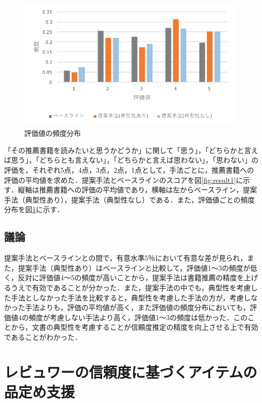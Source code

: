 \documentclass[a4paper,11pt,oneside,openany]{jsbook}
\begin{document}
\begin{figure}[tb]
	\begin{center} %
		\includegraphics [width = 110mm] {figures/result.pdf} %
	\end{center}
	\caption{評価値の頻度分布} %
	\label{fig:result2} %
\end{figure}

「その推薦書籍を読みたいと思うかどうか」に関して「思う」，「どちらかと言えば思う」，「どちらとも言えない」，「どちらかと言えば思わない」，「思わない」の評価を，それぞれ5点，4点，3点，2点，1点として，手法ごとに，推薦書籍への評価の平均値を求めた．提案手法とベースラインのスコアを図\ref{fig:result1}に示す．縦軸は推薦書籍への評価の平均値であり，横軸は左からベースライン，提案手法（典型性あり），提案手法（典型性なし）である．また，評価値ごとの頻度分布を図\ref{fig:result2}に示す．
	\section{議論}
提案手法とベースラインとの間で，有意水準5％において有意な差が見られ，また，提案手法（典型性あり）はベースラインと比較して，評価値1〜3の頻度が低く，反対に評価値4〜5の頻度が高いことから，提案手法は書籍推薦の精度を上げるうえで有効であることが分かった．また，提案手法の中でも，典型性を考慮した手法としなかった手法を比較すると，典型性を考慮した手法の方が，考慮しなかった手法よりも，評価の平均値が高く，また評価値の頻度分布においても，評価値4の頻度が考慮しない手法より高く，評価値1〜3の頻度は低かった．このことから，文書の典型性を考慮することが信頼度推定の精度を向上させる上で有効であることがわかった．


\chapter{レビュワーの信頼度に基づくアイテムの品定め支援}
\end{document}
